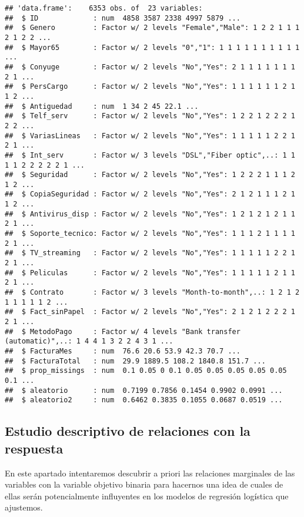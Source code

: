 \documentclass[
]{article}
\begin{document}
\begin{verbatim}
## 'data.frame':    6353 obs. of  23 variables:
##  $ ID             : num  4858 3587 2338 4997 5879 ...
##  $ Genero         : Factor w/ 2 levels "Female","Male": 1 2 2 1 1 1 2 1 2 2 ...
##  $ Mayor65        : Factor w/ 2 levels "0","1": 1 1 1 1 1 1 1 1 1 1 ...
##  $ Conyuge        : Factor w/ 2 levels "No","Yes": 2 1 1 1 1 1 1 1 2 1 ...
##  $ PersCargo      : Factor w/ 2 levels "No","Yes": 1 1 1 1 1 1 2 1 1 2 ...
##  $ Antiguedad     : num  1 34 2 45 22.1 ...
##  $ Telf_serv      : Factor w/ 2 levels "No","Yes": 1 2 2 1 2 2 2 1 2 2 ...
##  $ VariasLineas   : Factor w/ 2 levels "No","Yes": 1 1 1 1 1 2 2 1 2 1 ...
##  $ Int_serv       : Factor w/ 3 levels "DSL","Fiber optic",..: 1 1 1 1 2 2 2 2 2 1 ...
##  $ Seguridad      : Factor w/ 2 levels "No","Yes": 1 2 2 2 1 1 1 2 1 2 ...
##  $ CopiaSeguridad : Factor w/ 2 levels "No","Yes": 2 1 2 1 1 1 2 1 1 2 ...
##  $ Antivirus_disp : Factor w/ 2 levels "No","Yes": 1 2 1 2 1 2 1 1 2 1 ...
##  $ Soporte_tecnico: Factor w/ 2 levels "No","Yes": 1 1 1 2 1 1 1 1 2 1 ...
##  $ TV_streaming   : Factor w/ 2 levels "No","Yes": 1 1 1 1 1 2 2 1 2 1 ...
##  $ Peliculas      : Factor w/ 2 levels "No","Yes": 1 1 1 1 1 2 1 1 2 1 ...
##  $ Contrato       : Factor w/ 3 levels "Month-to-month",..: 1 2 1 2 1 1 1 1 1 2 ...
##  $ Fact_sinPapel  : Factor w/ 2 levels "No","Yes": 2 1 2 1 2 2 2 1 2 1 ...
##  $ MetodoPago     : Factor w/ 4 levels "Bank transfer (automatic)",..: 1 4 4 1 3 2 2 4 3 1 ...
##  $ FacturaMes     : num  76.6 20.6 53.9 42.3 70.7 ...
##  $ FacturaTotal   : num  29.9 1889.5 108.2 1840.8 151.7 ...
##  $ prop_missings  : num  0.1 0.05 0 0.1 0.05 0.05 0.05 0.05 0.05 0.1 ...
##  $ aleatorio      : num  0.7199 0.7856 0.1454 0.9902 0.0991 ...
##  $ aleatorio2     : num  0.6462 0.3835 0.1055 0.0687 0.0519 ...
\end{verbatim}

\hypertarget{estudio-descriptivo-de-relaciones-con-la-respuesta}{%
\subsection{Estudio descriptivo de relaciones con la
respuesta}\label{estudio-descriptivo-de-relaciones-con-la-respuesta}}

En este apartado intentaremos descubrir a priori las relaciones
marginales de las variables con la variable objetivo binaria para
hacernos una idea de cuales de ellas serán potencialmente influyentes en
los modelos de regresión logística que ajustemos.
\end{document}
